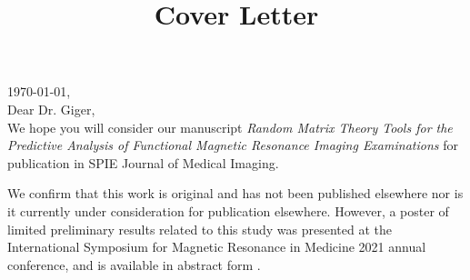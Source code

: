 \documentclass[10pt,letter]{article}
\begin{document}
% 
\thispagestyle{nofooter}  %
\setlength{\headheight}{30.0pt}
\normalsize

\title{Cover Letter}





\noindent
\today, \\
Dear Dr. Giger, \\

We hope you will consider our manuscript \emph{Random Matrix Theory Tools for
the Predictive Analysis of Functional Magnetic Resonance Imaging Examinations}
for publication in SPIE Journal of Medical Imaging.

We confirm that this work is original and has not been published elsewhere nor
is it currently under consideration for publication elsewhere. However, a
poster of limited preliminary results related to this study was presented at
the International Symposium for Magnetic Resonance in Medicine 2021 annual
conference, and is available in abstract form \citep{bergerOpenSourceRandom2021}.
\end{document}
